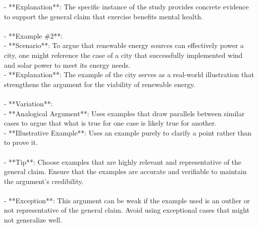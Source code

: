 \documentclass[a4paper,12pt,single,pdftex]{scrartcl}
\begin{document}
    
        - **Explanation**: The specific instance of the study provides concrete evidence to support the general claim that exercise benefits mental health.
    \\

    
      
    \\

    
      - **Example \#2**:
    \\

    
        - **Scenario**: To argue that renewable energy sources can effectively power a city, one might reference the case of a city that successfully implemented wind and solar power to meet its energy needs.
    \\

    
        - **Explanation**: The example of the city serves as a real-world illustration that strengthens the argument for the viability of renewable energy.
    \\

    
      
    \\

    
      - **Variation**:
    \\

    
        - **Analogical Argument**: Uses examples that draw parallels between similar cases to argue that what is true for one case is likely true for another.
    \\

    
        - **Illustrative Example**: Uses an example purely to clarify a point rather than to prove it.
    \\

    
      
    \\

    
      - **Tip**: Choose examples that are highly relevant and representative of the general claim. Ensure that the examples are accurate and verifiable to maintain the argument’s credibility.
    \\

    
      
    \\

    
      - **Exception**: This argument can be weak if the example used is an outlier or not representative of the general claim. Avoid using exceptional cases that might not generalize well.
    \\
\end{document}

